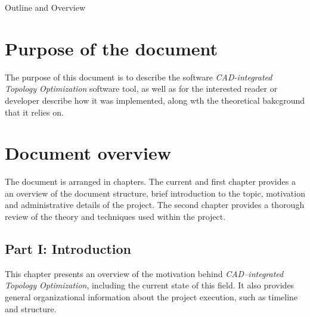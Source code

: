 \clearemptydoublepage

{}

\begin{center}
	\huge{Outline and Overview}
\end{center}




\section*{Purpose of the document}
The purpose of this document is to describe the software \emph{CAD-integrated Topology Optimization} software tool, as well as for the interested reader or developer describe how it was implemented, along wth the theoretical bakcground that it relies on.
%

\section*{Document overview}
The document is arranged in chapters. The current and first chapter provides a an overview of the document structure, brief introduction to the topic, motivation and administrative details of the project. The second chapter provides a thorough review of the theory and techniques used within the project.
\subsection*{Part I: Introduction}

  \vspace{1mm}

\noindent  This chapter presents an overview of the motivation behind \textit{CAD--integrated Topology Optimization}, including the current state of this field. It also provides general organizational information about the project execution, such as timeline and structure.
 \\


